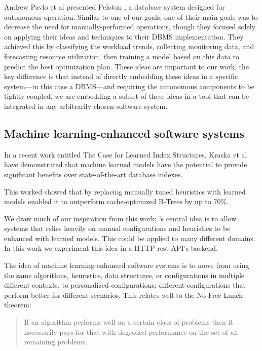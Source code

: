 Andrew Pavlo et al presented Peloton \cite{andrew_pavlo_self-driving_2017}, a database system designed for autonomous operation. Similar to one of our goals, one of their main goals was to decrease the need for manually-performed operations, though they focused solely on applying their ideas and techniques to their DBMS implementation. They achieved this by classifying the workload trends, collecting monitoring data, and forecasting resource utilization, then training a model based on this data to predict the best optimization plan. These ideas are important to our work, the key difference is that instead of directly embedding these ideas in a specific system---in this case a DBMS---and requiring the autonomous components to be tightly coupled, we are embedding a subset of these ideas in a tool that can be integrated in any arbitrarily chosen software system.

\subsection{Machine learning-enhanced software systems}

In a recent work entitled The Case for Learned Index Structures, Kraska et al have demonstrated that machine learned models have the potential to provide significant benefits over state-of-the-art database indexes. \cite{kraska_case_2017}

This worked showed that by replacing manually tuned heuristics with learned models enabled it to outperform cache-optimized B-Trees by up to 70\%.

We draw much of our inspiration from this work; \projectname{}'s central idea is to allow systems that relies heavily on manual configurations and heuristics to be enhanced with learned models. This could be applied to many different domains. In this work we experiment this idea in a HTTP rest API's backend.  

The idea of machine learning-enhanced software systems is to move from using the same algorithms, heuristics, data structures, or configurations in multiple different contexts, to personalized configurations; different configurations that perform better for different scenarios. This relates well to the No Free Lunch theorem:
\begin{quote}
  If an algorithm performs well on a certain class of problems then it necessarily pays for that with degraded performance on the set of all remaining problems.
\end{quote}


